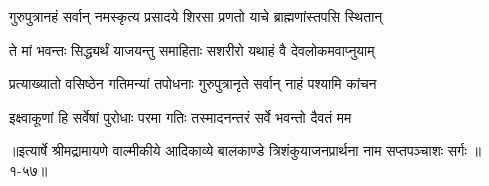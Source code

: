 \twolineshloka
{गुरुपुत्रानहं सर्वान् नमस्कृत्य प्रसादये}
{शिरसा प्रणतो याचे ब्राह्मणांस्तपसि स्थितान्} %

\twolineshloka
{ते मां भवन्तः सिद्ध्यर्थं याजयन्तु समाहिताः}
{सशरीरो यथाहं वै देवलोकमवाप्नुयाम्} %

\twolineshloka
{प्रत्याख्यातो वसिष्ठेन गतिमन्यां तपोधनाः}
{गुरुपुत्रानृते सर्वान् नाहं पश्यामि कांचन} %

\twolineshloka
{इक्ष्वाकूणां हि सर्वेषां पुरोधाः परमा गतिः}
{तस्मादनन्तरं सर्वे भवन्तो दैवतं मम} %


॥इत्यार्षे श्रीमद्रामायणे वाल्मीकीये आदिकाव्ये बालकाण्डे त्रिशंकुयाजनप्रार्थना नाम सप्तपञ्चाशः सर्गः ॥१-५७॥
